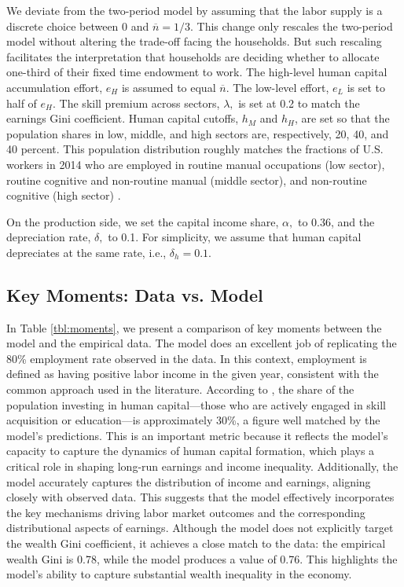 \documentclass[12pt]{article}
\begin{document}
We deviate from the two-period model by assuming that the labor supply is a discrete choice between 0 and $\overline{n}=1/3$. This change only rescales the two-period model without altering the trade-off facing the households. But such rescaling facilitates the interpretation that households are deciding whether to allocate one-third of their fixed time endowment to work. The high-level human capital accumulation
effort, $e_{H}$ is assumed to equal $\overline{n}.$ The low-level
effort, $e_{L}$ is set to half of $e_{H}$. The skill premium across
sectors, $\lambda,$ is set at 0.2 to match the earnings Gini coefficient.
Human capital cutoffs, $h_{M}$ and $h_{H}$, are set so that the population shares in low, middle, and high sectors are, respectively, 20, 40, and 40 percent. This population distribution roughly matches the fractions of U.S. workers in 2014 who are employed in routine manual occupations (low sector), routine cognitive and non-routine manual (middle sector), and non-routine cognitive (high sector) \cite{cortes_disappearing_2017}.


On the production side, we set the capital income share, $\alpha,$ to 0.36, and the depreciation rate, $\delta,$ to 0.1. For simplicity, we assume that human capital depreciates at the same rate, i.e., $\delta_h =0.1$.

\subsection{Key Moments: Data vs. Model}

In Table \ref{tbl:moments}, we present a comparison of
key moments between the model and the empirical data. The model does
an excellent job of replicating the 80\% employment rate observed
in the data. In this context, employment is defined as having positive
labor income in the given year, consistent with the common approach
used in the literature. According to \citet{oecd2025adultlearning}, the share
of the population investing in human capital---those who are actively
engaged in skill acquisition or education---is approximately 30\%,
a figure well matched by the model\textquoteright s predictions. This
is an important metric because it reflects the model's capacity to
capture the dynamics of human capital formation, which plays a critical
role in shaping long-run earnings and income inequality. Additionally,
the model accurately captures the distribution of income and earnings,
aligning closely with observed data. This suggests that the model
effectively incorporates the key mechanisms driving labor market outcomes
and the corresponding distributional aspects of earnings. Although the model does not explicitly target the wealth Gini coefficient, it achieves a close match to the data: the empirical wealth Gini is 0.78, while the model produces a value of 0.76. This highlights the model’s ability to capture substantial wealth inequality in the economy.
\end{document}
